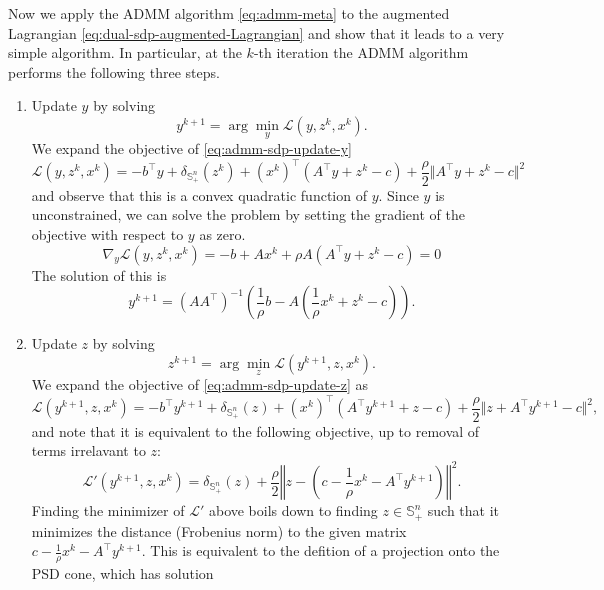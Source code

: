 \documentclass[
]{book}
\theoremstyle{definition}
\theoremstyle{definition}
\theoremstyle{definition}
\theoremstyle{definition}
\theoremstyle{remark}
\begin{document}
Now we apply the ADMM algorithm \eqref{eq:admm-meta} to the augmented Lagrangian \eqref{eq:dual-sdp-augmented-Lagrangian} and show that it leads to a very simple algorithm. In particular, at the \(k\)-th iteration the ADMM algorithm performs the following three steps.

\begin{enumerate}
\def\labelenumi{\arabic{enumi}.}
\item
  Update \(y\) by solving
  \begin{equation}
  y^{k+1} = \arg\min_{y} \mathcal{L}(y,z^k,x^k).
  \label{eq:admm-sdp-update-y}
  \end{equation}
  We expand the objective of \eqref{eq:admm-sdp-update-y}
  \[
  \mathcal{L}(y,z^k,x^k) = -b^\top y + \delta_{\mathbb{S}^{n}_{+}}(z^k) + (x^k)^\top(A^\top y + z^k - c) + \frac{\rho}{2} \Vert A^\top y + z^k - c \Vert^2
  \]
  and observe that this is a convex quadratic function of \(y\). Since \(y\) is unconstrained, we can solve the problem by setting the gradient of the objective with respect to \(y\) as zero.
  \[
  \nabla_y \mathcal{L}(y,z^k,x^k) = - b + A x^k + \rho A (A^\top y + z^k - c) = 0
  \]
  The solution of this is
  \begin{equation}
  \boxed{
   y^{k+1} = (AA^\top)^{-1}\left( \frac{1}{\rho} b - A \left( \frac{1}{\rho} x^k + z^k - c\right)  \right)
  }.
  \label{eq:admm-sdp-update-y-sol}
  \end{equation}
\item
  Update \(z\) by solving
  \begin{equation}
  z^{k+1} = \arg\min_{z} \mathcal{L}(y^{k+1},z,x^k).
  \label{eq:admm-sdp-update-z}
  \end{equation}
  We expand the objective of \eqref{eq:admm-sdp-update-z} as
  \[
  \mathcal{L}(y^{k+1}, z, x^k) = -b^\top y^{k+1} + \delta_{\mathbb{S}^{n}_{+}} (z) + (x^k)^\top(A^\top y^{k+1} + z - c) + \frac{\rho}{2} \Vert z + A^\top y^{k+1} - c \Vert^2,
  \]
  and note that it is equivalent to the following objective, up to removal of terms irrelavant to \(z\):
  \[
  \mathcal{L}'(y^{k+1}, z, x^k) = \delta_{\mathbb{S}^{n}_{+}} (z) + \frac{\rho}{2} \left\Vert z - \left( c - \frac{1}{\rho} x^k - A^\top y^{k+1} \right) \right\Vert^2.
  \]
  Finding the minimizer of \(\mathcal{L}'\) above boils down to finding \(z \in \mathbb{S}^{n}_{+}\) such that it minimizes the distance (Frobenius norm) to the given matrix \(c - \frac{1}{\rho} x^k - A^\top y^{k+1}\). This is equivalent to the defition of a projection onto the PSD cone, which has solution
  \begin{equation}

\end{equation}
\end{enumerate}
\end{document}
